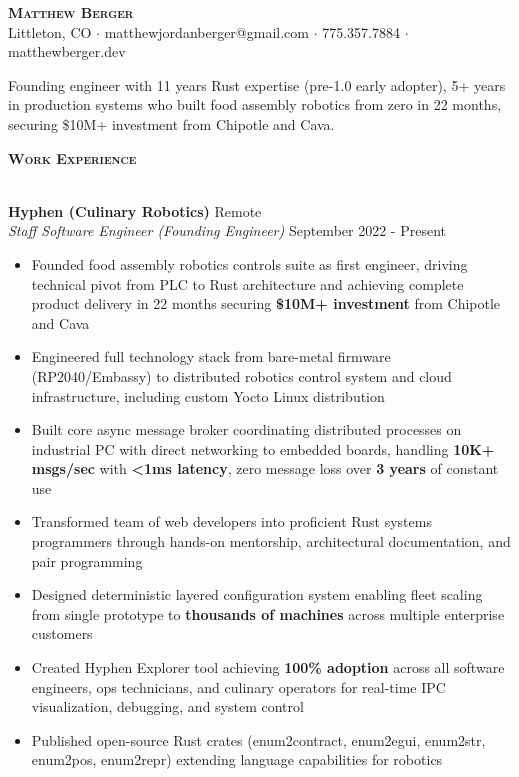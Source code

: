 \documentclass[a4paper]{article}
\newcommand{\lineunder} {
    \vspace*{-8pt} \\
    \hspace*{-18pt} \hrulefill \\
}
\newcommand{\header} [1] {
    {\hspace*{-18pt}\vspace*{6pt} \large \textbf{\textsc{#1}}}
    \vspace*{-6pt} \lineunder
    \vspace*{4pt}
}
\begin{document}
\vspace*{-40pt}

\begin{center}
    {\Huge \scshape \textbf{Matthew Berger}}\\
    \vspace*{4pt}
    Littleton, CO $\cdot$ matthewjordanberger@gmail.com $\cdot$ 775.357.7884 $\cdot$ matthewberger.dev\\
\end{center}

\vspace*{-6pt}
Founding engineer with 11 years Rust expertise (pre-1.0 early adopter), 5+ years in production systems who built food assembly robotics from zero in 22 months, securing \$10M+ investment from Chipotle and Cava.
\vspace*{8pt}

\header{Work Experience}

\textbf{Hyphen (Culinary Robotics)} \hfill Remote\\
\textit{Staff Software Engineer (Founding Engineer)} \hfill September 2022 - Present\\
\vspace{-1mm}
\begin{itemize} \itemsep 1pt
    \item Founded food assembly robotics controls suite as first engineer, driving technical pivot from PLC to Rust architecture and achieving complete product delivery in 22 months securing \textbf{\$10M+ investment} from Chipotle and Cava
    \item Engineered full technology stack from bare-metal firmware (RP2040/Embassy) to distributed robotics control system and cloud infrastructure, including custom Yocto Linux distribution
    \item Built core async message broker coordinating distributed processes on industrial PC with direct networking to embedded boards, handling \textbf{10K+ msgs/sec} with \textbf{<1ms latency}, zero message loss over \textbf{3 years} of constant use
    \item Transformed team of web developers into proficient Rust systems programmers through hands-on mentorship, architectural documentation, and pair programming
    \item Designed deterministic layered configuration system enabling fleet scaling from single prototype to \textbf{thousands of machines} across multiple enterprise customers
    \item Created Hyphen Explorer tool achieving \textbf{100\% adoption} across all software engineers, ops technicians, and culinary operators for real-time IPC visualization, debugging, and system control
    \item Published open-source Rust crates (enum2contract, enum2egui, enum2str, enum2pos, enum2repr) extending language capabilities for robotics
\end{itemize}
\end{document}
